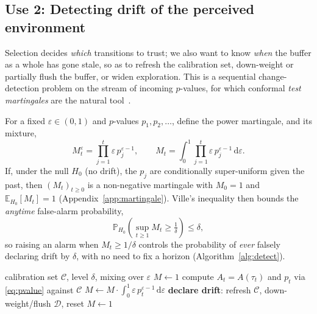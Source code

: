 \documentclass[sigconf]{aamas}
\newcommand{\Dcal}{\mathcal{D}}
\newcommand{\Ccal}{\mathcal{C}}
\begin{document}
\subsection{Use 2: Detecting drift of the perceived environment}
\label{sec:detection}
Selection decides \emph{which} transitions to trust; we also want to know
\emph{when} the buffer as a whole has gone stale, so as to refresh the
calibration set, down-weight or partially flush the buffer, or widen exploration.
This is a sequential change-detection problem on the stream of incoming
$p$-values, for which conformal \emph{test martingales} are the natural
tool~\cite{vovk2003testing,volkhonskiy2017inductive,ramdas2023gametheoretic}.

For a fixed $\varepsilon\in(0,1)$ and $p$-values $p_1,p_2,\dots$, define the
power martingale, and its mixture,
\begin{equation}
\label{eq:martingale}
M_t^{\varepsilon}=\prod_{j=1}^{t}\varepsilon\,p_j^{\varepsilon-1},
\qquad
M_t=\int_0^1\prod_{j=1}^{t}\varepsilon\,p_j^{\varepsilon-1}\,\mathrm{d}\varepsilon .
\end{equation}
If, under the null $H_0$ (no drift), the $p_j$ are conditionally super-uniform
given the past, then $(M_t)_{t\ge0}$ is a non-negative martingale with
$M_0=1$ and $\mathbb{E}_{H_0}[M_t]=1$ (Appendix~\ref{app:martingale}). Ville's
inequality then bounds the \emph{anytime} false-alarm probability,
\begin{equation}
\label{eq:ville}
\mathbb{P}_{H_0}\!\left(\sup_{t\ge1}M_t\ge \tfrac1\delta\right)\le\delta,
\end{equation}
so raising an alarm when $M_t\ge1/\delta$ controls the probability of \emph{ever}
falsely declaring drift by $\delta$, with no need to fix a horizon
(Algorithm~\ref{alg:detect}).

\begin{algorithm}[t]
\caption{Conformal Drift Detection (per agent $a$)}
\label{alg:detect}
\begin{algorithmic}[1]
\Require calibration set $\Ccal$, level $\delta$, mixing over $\varepsilon$
\State $M\gets1$
  \State compute $A_t=A(\tau_t)$ and $p_t$ via \eqref{eq:pvalue} against $\Ccal$
  \State $M\gets M\cdot\int_0^1\varepsilon\,p_t^{\varepsilon-1}\,\mathrm{d}\varepsilon$
    \State \textbf{declare drift}: refresh $\Ccal$, down-weight/flush $\Dcal$,
    reset $M\gets1$
  \EndIf
\EndFor
\end{algorithmic}
\end{algorithm}
\end{document}
